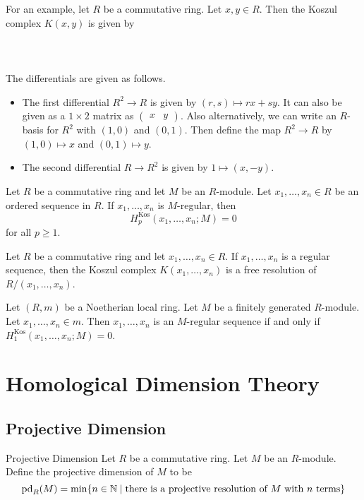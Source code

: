 \documentclass[a4paper]{article}
\begin{document}
For an example, let $R$ be a commutative ring. Let $x,y\in R$. Then the Koszul complex $K(x,y)$ is given by \\~\\
\\~\\
The differentials are given as follows. 
\begin{itemize}
\item The first differential $R^2\to R$ is given by $(r,s)\mapsto rx+sy$. It can also be given as a $1\times 2$ matrix as $\begin{pmatrix}x & y\end{pmatrix}$. Also alternatively, we can write an $R$-basis for $R^2$ with $(1,0)$ and $(0,1)$. Then define the map $R^2\to R$ by $(1,0)\mapsto x$ and $(0,1)\mapsto y$. 
\item The second differential $R\to R^2$ is given by $1\mapsto(x,-y)$. 
\end{itemize}

\begin{prp}{}{} Let $R$ be a commutative ring and let $M$ be an $R$-module. Let $x_1,\dots,x_n\in R$ be an ordered sequence in $R$. If $x_1,\dots,x_n$ is $M$-regular, then $$H_p^\text{Kos}(x_1,\dots,x_n;M)=0$$ for all $p\geq 1$. 
\end{prp}

\begin{crl}{}{} Let $R$ be a commutative ring and let $x_1,\dots,x_n\in R$. If $x_1,\dots,x_n$ is a regular sequence, then the Koszul complex $K(x_1,\dots,x_n)$ is a free resolution of $R/(x_1,\dots,x_n)$. 
\end{crl}

\begin{prp}{}{} Let $(R,m)$ be a Noetherian local ring. Let $M$ be a finitely generated $R$-module. Let $x_1,\dots,x_n\in m$. Then $x_1,\dots,x_n$ is an $M$-regular sequence if and only if $H_1^\text{Kos}(x_1,\dots,x_n;M)=0$. 
\end{prp}

\pagebreak
\section{Homological Dimension Theory}
\subsection{Projective Dimension}
\begin{defn}{Projective Dimension}{} Let $R$ be a commutative ring. Let $M$ be an $R$-module. Define the projective dimension of $M$ to be $$\text{pd}_R(M)=\min\{n\in\mathbb{N}\;|\;\text{there is a projective resolution of }M\text{ with }n\text{ terms}\}$$
\end{defn}
\end{document}
